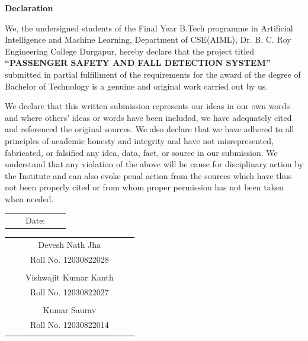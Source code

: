 \thispagestyle{empty}

\begin{center}
\Large {\bf Declaration}
\end{center}
\vspace{0.5in}
We, the undersigned students of the Final Year B.Tech programme in Artificial Intelligence and Machine Learning, Department of CSE(AIML), Dr. B. C. Roy Engineering College Durgapur, hereby declare that the project titled \textbf{``PASSENGER SAFETY AND FALL DETECTION SYSTEM''} submitted in partial fulfillment of the requirements for the award of the degree of Bachelor of Technology is a genuine and original work carried out by us.

We declare that this written submission represents our ideas in our own words and where others' ideas or words have been included, we have adequately cited and referenced the original sources. We also declare that we have adhered to all principles of academic honesty and integrity and have not misrepresented, fabricated, or falsified any idea, data, fact, or source in our submission. We understand that any violation of the above will be cause for disciplinary action by the Institute and can also evoke penal action from the sources which have thus not been properly cited or from whom proper permission has not been taken when needed.

\vspace{3.5cm}

\begin{table}[h]
 \begin{flushleft}
\vspace{0.2in}
 \begin{tabular}{ccccc}
 && Date: && \\
 \end{tabular}
\end{flushleft}

\vspace{-0.5in}
\begin{flushright}
 \begin{tabular}{ccccc}

 \hline \rule[5ex]{0pt}{-10ex}&& Devesh Nath Jha && \\
 \rule[5ex]{0pt}{-10ex}&& Roll No. 12030822028 && \\ \\
 \hline \rule[5ex]{0pt}{-10ex}&& Vishwajit Kumar Kanth && \\
 \rule[5ex]{0pt}{-10ex}&& Roll No. 12030822027 && \\ \\
 \hline \rule[5ex]{0pt}{-10ex}&& Kumar Saurav && \\
 \rule[5ex]{0pt}{-10ex}&& Roll No. 12030822014 && \\ \\
 \end{tabular}
\end{flushright}
\end{table}

\pagebreak